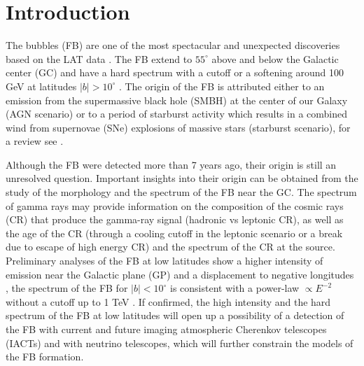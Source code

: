 \section{Introduction}



The \Fermi bubbles (FB) are one of the most spectacular and unexpected discoveries based on the \Fermi LAT data
\citep{2010ApJ...724.1044S}.
The FB extend to $55^\circ$ above and below the Galactic center (GC)
and have a hard spectrum with a cutoff or a softening around 100 GeV at latitudes $|b| > 10^\circ$ \citep{2014ApJ...793...64A}.
The origin of the FB is attributed either to an emission from the supermassive black hole (SMBH) at
the center of our Galaxy (AGN scenario)
or to a period of starburst activity which results in a combined wind
from supernovae (SNe) explosions of massive stars (starburst scenario),  for a review see \cite{2010ApJ...711..818S}.

Although the FB were detected more than 7 years ago, their origin is still an unresolved question.
Important insights into their origin can be obtained from the study of the morphology and the spectrum of the FB near the GC.
The spectrum of gamma rays may provide information on the composition of the 
cosmic rays (CR) that produce the gamma-ray signal (hadronic vs leptonic CR),
as well as the age of the CR (through a cooling cutoff in the leptonic scenario or a break due to escape of high energy CR)
and the spectrum of the CR at the source.
Preliminary analyses of the FB at low latitudes show a higher intensity of emission near the Galactic plane (GP) and a displacement
to negative longitudes \citep{2016ApJS..223...26A, 2017ApJ...840...43A},
the spectrum of the FB for $|b| < 10^\circ$ is consistent with a power-law $\propto E^{-2}$ 
without a cutoff up to 1 TeV \citep{2017ApJ...840...43A}.
If confirmed, the high intensity and the hard spectrum
of the FB at low latitudes will open up a possibility of a detection of the FB with current and future imaging atmospheric Cherenkov telescopes (IACTs)
and with neutrino telescopes, which will further constrain the models of the FB formation.

